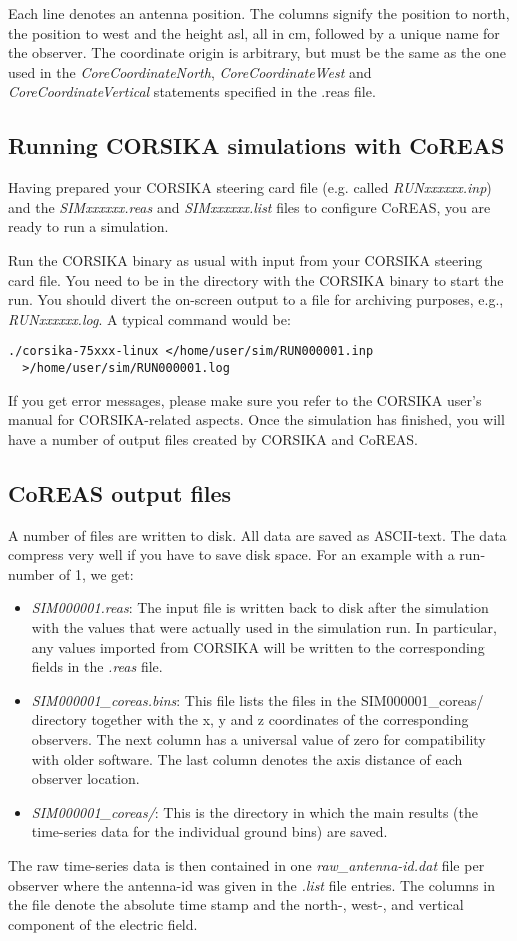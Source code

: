 \documentclass[a4paper,10pt]{article}
\begin{document}
Each line denotes an antenna position. The columns signify the position to north, the position to west and the height asl, all in cm, followed by a unique name for the observer. The coordinate origin is arbitrary, but must be the same as the one used in the {\it CoreCoordinateNorth}, {\it CoreCoordinateWest} and {\it CoreCoordinateVertical} statements specified in the .reas file.

\subsection{Running CORSIKA simulations with CoREAS} \label{sec:corsikafiles}

Having prepared your CORSIKA steering card file (e.g. called {\it RUNxxxxxx.inp}) and the {\it SIMxxxxxx.reas} and {\it SIMxxxxxx.list} files to configure CoREAS, you are ready to run a simulation.

Run the CORSIKA binary as usual with input from your CORSIKA steering card file. You need to be in the directory with the CORSIKA binary to start the run. You should divert the on-screen output to a file for archiving purposes, e.g., {\it RUNxxxxxx.log}. A typical command would be:
%
\begin{verbatim}
./corsika-75xxx-linux </home/user/sim/RUN000001.inp
  >/home/user/sim/RUN000001.log
\end{verbatim}
%
If you get error messages, please make sure you refer to the CORSIKA user's manual for CORSIKA-related aspects. Once the simulation has finished, you will have a number of output files created by CORSIKA and CoREAS.

\subsection{CoREAS output files}

A number of files are written to disk. All data are saved as ASCII-text. The data compress very well if you have to save disk space. For an example with a run-number of 1, we get:
%
\begin{itemize}
\item{{\it SIM000001.reas}: The input file is written back to disk after the simulation with the values that were actually used in the simulation run. In particular, any values imported from CORSIKA will be written to the corresponding fields in the {\it .reas} file.}
\item{{\it SIM000001\_coreas.bins}: This file lists the files in the SIM000001\_coreas/ directory together with the x, y and z coordinates of the corresponding observers. The next column has a universal value of zero for compatibility with older software. The last column denotes the axis distance of each observer location.}
\item{{\it SIM000001\_coreas/}: This is the directory in which the main results (the time-series data for the individual ground bins) are saved.}
\end{itemize}
%
The raw time-series data is then contained in one {\it raw\_antenna-id.dat} file per observer where the antenna-id was given in the {\it .list} file entries. The columns in the file denote the absolute time stamp and the north-, west-, and vertical component of the electric field.  
\end{document}
